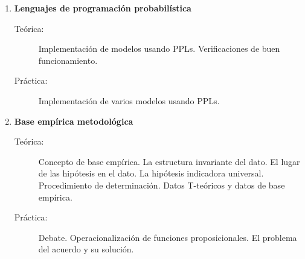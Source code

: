 \documentclass[10pt]{article}
\begin{document}
\begin{enumerate}


\vspace{0.1cm}
\item \textbf{Lenguajes de programación probabilística}
\vspace{-0.15cm}
\begin{description}
\item[Teórica:] Implementación de modelos usando PPLs. Verificaciones de buen funcionamiento. 
\item[Práctica:] Implementación de varios modelos usando PPLs.
\end{description}


\vspace{0.1cm}
\item \textbf{Base empírica metodológica}
\vspace{-0.15cm}
\begin{description}
\item[Teórica:] Concepto de base empírica. La estructura invariante del dato. El lugar de las hipótesis en el dato. La hipótesis indicadora universal. Procedimiento de determinación. Datos T-teóricos y datos de base empírica.
\item[Práctica:] Debate. Operacionalización de funciones proposicionales. El problema del acuerdo y su solución.


\end{description}

\end{enumerate}

\nocite{jaynes1984-bayesianBackground, mcelreath2020-rethinking, bishop2006-PRML, pearl2009-causality, cinelli2021-crashCourse, stan-userGuide, martin2021-BMCP, samaja1999-epistemologiaMetodologia }

{

}
\end{document}
